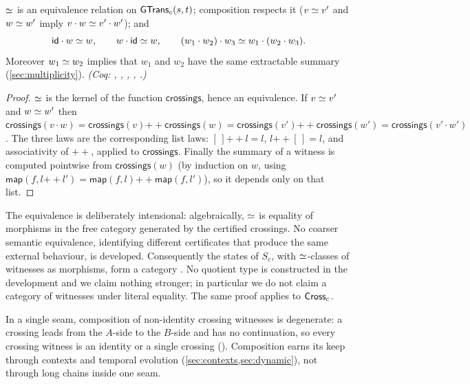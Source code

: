 \begin{thm}\label{thm:algebra}
$\mathrel{\simeq}$ is an equivalence relation on $\mathsf{GTrans}_c(s,t)$; composition respects it ($v \mathrel{\simeq} v'$ and $w \mathrel{\simeq} w'$ imply $v \cdot w \mathrel{\simeq} v' \cdot w'$); and
\[
\mathsf{id} \cdot w \mathrel{\simeq} w, \qquad w \cdot \mathsf{id} \mathrel{\simeq} w, \qquad (w_1 \cdot w_2) \cdot w_3 \mathrel{\simeq} w_1 \cdot (w_2 \cdot w_3).
\]
Moreover $w_1 \mathrel{\simeq} w_2$ implies that $w_1$ and $w_2$ have the same extractable summary (\cref{sec:multiplicity}). \emph{(Coq: , , , , .)}
\end{thm}
\begin{proof}
$\mathrel{\simeq}$ is the kernel of the function $\mathsf{crossings}$, hence an equivalence. If $v \mathrel{\simeq} v'$ and $w \mathrel{\simeq} w'$ then
$\mathsf{crossings}(v \cdot w) = \mathsf{crossings}(v) \mathbin{+\!\!+} \mathsf{crossings}(w) = \mathsf{crossings}(v') \mathbin{+\!\!+} \mathsf{crossings}(w') = \mathsf{crossings}(v' \cdot w')$.
The three laws are the corresponding list laws: $[\,] \mathbin{+\!\!+} l = l$, $l \mathbin{+\!\!+} [\,] = l$, and associativity of $\mathbin{+\!\!+}$, applied to $\mathsf{crossings}$. Finally the summary of a witness is computed pointwise from $\mathsf{crossings}(w)$ (by induction on $w$, using $\mathsf{map}(f, l \mathbin{+\!\!+} l') = \mathsf{map}(f,l) \mathbin{+\!\!+} \mathsf{map}(f,l')$), so it depends only on that list.
\end{proof}
The equivalence is deliberately intensional: algebraically, $\mathrel{\simeq}$ is equality of morphisms in the free category generated by the certified crossings. No coarser semantic equivalence, identifying different certificates that produce the same external behaviour, is developed. Consequently the states of $S_c$, with $\mathrel{\simeq}$-classes of witnesses as morphisms, form a category \cite{maclane1998}. No quotient type is constructed in the development and we claim nothing stronger; in particular we do not claim a category of witnesses under literal equality. The same proof applies to $\mathsf{Cross}_c$.

\begin{rem}\label{rem:degenerate}
In a single seam, composition of non-identity crossing witnesses is degenerate: a crossing leads from the $A$-side to the $B$-side and has no continuation, so every crossing witness is an identity or a single crossing (). Composition earns its keep through contexts and temporal evolution (\cref{sec:contexts,sec:dynamic}), not through long chains inside one seam.
\end{rem}

